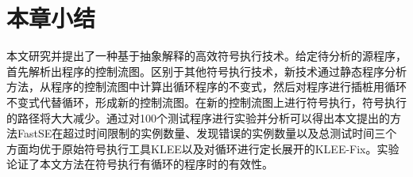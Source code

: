 \section{本章小结}
\label{sec-conclusion}
本文研究并提出了一种基于抽象解释的高效符号执行技术。给定待分析的源程序，首先解析出程序的控制流图。区别于其他符号执行技术，新技术通过静态程序分析方法，从程序的控制流图中计算出循环程序的不变式，然后对程序进行插桩用循环不变式代替循环，形成新的控制流图。在新的控制流图上进行符号执行，符号执行的路径将大大减少。通过对100个测试程序进行实验并分析可以得出本文提出的方法FastSE在超过时间限制的实例数量、发现错误的实例数量以及总测试时间三个方面均优于原始符号执行工具KLEE以及对循环进行定长展开的KLEE-Fix。实验论证了本文方法在符号执行有循环的程序时的有效性。
